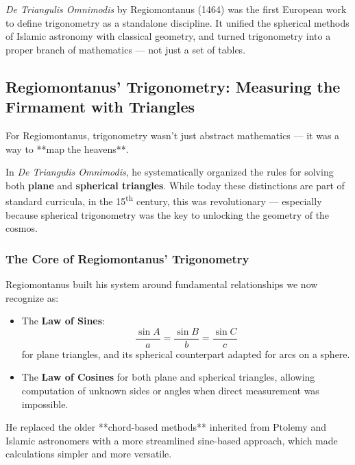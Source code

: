 \begin{tcolorbox}[colback=gray!5!white, colframe=black, title=\textbf{TL;DR: The First Book of Trigonometry}, fonttitle=\bfseries, arc=1.5mm, boxrule=0.4pt]
\textit{De Triangulis Omnimodis} by Regiomontanus (1464) was the first European work to define trigonometry as a standalone discipline.  
It unified the spherical methods of Islamic astronomy with classical geometry, and turned trigonometry into a proper branch of mathematics — not just a set of tables.
\end{tcolorbox}



\subsection{Regiomontanus’ Trigonometry: Measuring the Firmament with Triangles}

For Regiomontanus, trigonometry wasn’t just abstract mathematics — it was a way to **map the heavens**.

In \textit{De Triangulis Omnimodis}, he systematically organized the rules for solving both \textbf{plane} and \textbf{spherical triangles}. While today these distinctions are part of standard curricula, in the 15\textsuperscript{th} century, this was revolutionary — especially because spherical trigonometry was the key to unlocking the geometry of the cosmos.

\subsubsection*{The Core of Regiomontanus’ Trigonometry}

Regiomontanus built his system around fundamental relationships we now recognize as:

\begin{itemize}
  \item The \textbf{Law of Sines}:
  \[
  \frac{\sin A}{a} = \frac{\sin B}{b} = \frac{\sin C}{c}
  \]
  for plane triangles, and its spherical counterpart adapted for arcs on a sphere.
  
  \item The \textbf{Law of Cosines} for both plane and spherical triangles, allowing computation of unknown sides or angles when direct measurement was impossible.
\end{itemize}

He replaced the older **chord-based methods** inherited from Ptolemy and Islamic astronomers with a more streamlined sine-based approach, which made calculations simpler and more versatile.

